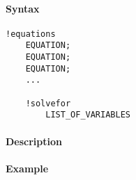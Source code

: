 


	\paragraph{Syntax}\label{syntax}

\begin{verbatim}
!equations
    EQUATION;
    EQUATION;
    EQUATION;
    ...

    !solvefor
        LIST_OF_VARIABLES
\end{verbatim}

\paragraph{Description}\label{description}

\paragraph{Example}\label{example}


